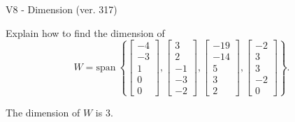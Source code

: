 \begin{exercise}
  \begin{exerciseTitle}V8 - Dimension (ver. 317)\end{exerciseTitle}
  \begin{exerciseStatement}
    Explain how to find the dimension of 
\[W=\mathrm{span}\ \left\{\left[\begin{array}{r}
-4 \\
-3 \\
1 \\
0 \\
0
\end{array}\right] , \left[\begin{array}{r}
3 \\
2 \\
-1 \\
-3 \\
-2
\end{array}\right] , \left[\begin{array}{r}
-19 \\
-14 \\
5 \\
3 \\
2
\end{array}\right] , \left[\begin{array}{r}
-2 \\
3 \\
3 \\
-2 \\
0
\end{array}\right]\right\}.\]



  \end{exerciseStatement}
  \begin{exerciseAnswer}
   The dimension of \(W\) is  \(3\).
  


  \end{exerciseAnswer}
\end{exercise}